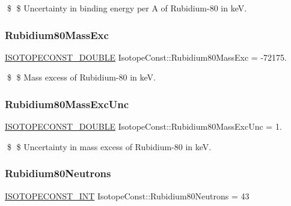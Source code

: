 \$ \$ Uncertainty in binding energy per A of Rubidium-\/80 in keV. \mbox{\label{group___isotope_const-_rubidium-_rb80_ga21c453bfefe8210f30c63924abc4e0d2}} 
\subsubsection{\texorpdfstring{Rubidium80\+Mass\+Exc}{Rubidium80MassExc}}
{\footnotesize\ttfamily \mbox{\hyperlink{group___isotope_const-_macros_ga8f45a7272ce02c0b4c65c44636ed719a}{I\+S\+O\+T\+O\+P\+E\+C\+O\+N\+S\+T\+\_\+\+D\+O\+U\+B\+LE}} Isotope\+Const\+::\+Rubidium80\+Mass\+Exc = -\/72175.}

\$ \$ Mass excess of Rubidium-\/80 in keV. \mbox{\label{group___isotope_const-_rubidium-_rb80_gad179cc8e23992c23e0cacf6ea04b55f9}} 
\subsubsection{\texorpdfstring{Rubidium80\+Mass\+Exc\+Unc}{Rubidium80MassExcUnc}}
{\footnotesize\ttfamily \mbox{\hyperlink{group___isotope_const-_macros_ga8f45a7272ce02c0b4c65c44636ed719a}{I\+S\+O\+T\+O\+P\+E\+C\+O\+N\+S\+T\+\_\+\+D\+O\+U\+B\+LE}} Isotope\+Const\+::\+Rubidium80\+Mass\+Exc\+Unc = 1.}

\$ \$ Uncertainty in mass excess of Rubidium-\/80 in keV. \mbox{\label{group___isotope_const-_rubidium-_rb80_gabf78c82f63bfb01d27f1be5c07024efc}} 
\subsubsection{\texorpdfstring{Rubidium80\+Neutrons}{Rubidium80Neutrons}}
{\footnotesize\ttfamily \mbox{\hyperlink{group___isotope_const-_macros_ga5f18360b3e99483a35c32d789e62621c}{I\+S\+O\+T\+O\+P\+E\+C\+O\+N\+S\+T\+\_\+\+I\+NT}} Isotope\+Const\+::\+Rubidium80\+Neutrons = 43}


